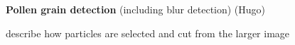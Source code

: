\textbf{Pollen grain detection} (including blur detection) (Hugo)

describe how particles are selected and cut from the larger image
    